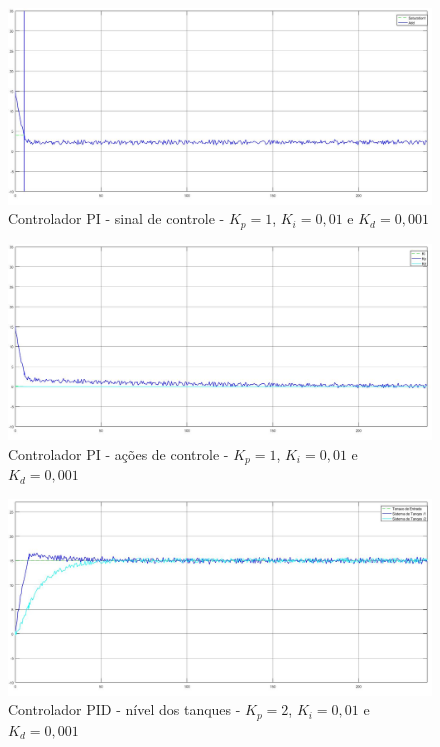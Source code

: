 \documentclass[
	12pt,				%
	openany,			%
	oneside,			%
	a4paper,			%
	english,			%
	french,				%
	spanish,			%
	brazil,				%
	]{abntex2}
\begin{document}
{\begin{figure}[h]
	\centering
	\includegraphics[scale=0.30]{4 - PDI sinal_controle.jpg}
	\caption{Controlador PI - sinal de controle - $K_p = 1$, $K_i = 0,01$ e $K_d=0,001$}
	\label{fig:sinal_controladorPID_1}
\end{figure}

\begin{figure}[h]
	\centering
	\includegraphics[scale=0.30]{4 - PDI acoes_controle.jpg}
	\caption{Controlador PI - ações de controle - $K_p = 1$, $K_i = 0,01$ e $K_d=0,001$}
	\label{fig:acao_controladorPID_1}
\end{figure}

\begin{figure}[h]
	\centering
	\includegraphics[scale=0.30]{6 - nivel_ PDI_2kp_01ki_0001kd.jpg}
	\caption{Controlador PID - nível dos tanques - $K_p = 2$, $K_i = 0,01$ e $K_d=0,001$}
	\label{fig:controladorPID_2}
\end{figure}

}
\end{document}
